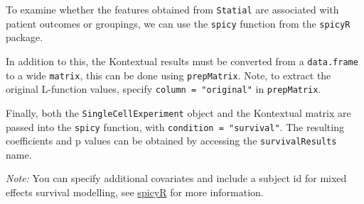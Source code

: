 \documentclass[
  letterpaper,
  DIV=11,
  numbers=noendperiod]{scrreprt}
\newenvironment{Shaded}{\begin{snugshade}}{\end{snugshade}}
\newcommand{\AttributeTok}[1]{\textcolor[rgb]{0.40,0.45,0.13}{#1}}
\newcommand{\CommentTok}[1]{\textcolor[rgb]{0.37,0.37,0.37}{#1}}
\newcommand{\ConstantTok}[1]{\textcolor[rgb]{0.56,0.35,0.01}{#1}}
\newcommand{\DecValTok}[1]{\textcolor[rgb]{0.68,0.00,0.00}{#1}}
\newcommand{\FunctionTok}[1]{\textcolor[rgb]{0.28,0.35,0.67}{#1}}
\newcommand{\NormalTok}[1]{\textcolor[rgb]{0.00,0.23,0.31}{#1}}
\newcommand{\OtherTok}[1]{\textcolor[rgb]{0.00,0.23,0.31}{#1}}
\newcommand{\SpecialCharTok}[1]{\textcolor[rgb]{0.37,0.37,0.37}{#1}}
\newcommand{\StringTok}[1]{\textcolor[rgb]{0.13,0.47,0.30}{#1}}
\begin{document}
To examine whether the features obtained from \texttt{Statial} are
associated with patient outcomes or groupings, we can use the
\texttt{spicy} function from the \texttt{spicyR} package.

In addition to this, the Kontextual results must be converted from a
\texttt{data.frame} to a wide \texttt{matrix}, this can be done using
\texttt{prepMatrix}. Note, to extract the original L-function values,
specify \texttt{column\ =\ "original"} in \texttt{prepMatrix}.

\begin{Shaded}
\end{Shaded}

Finally, both the \texttt{SingleCellExperiment} object and the
Kontextual matrix are passed into the \texttt{spicy} function, with
\texttt{condition\ =\ "survival"}. The resulting coefficients and p
values can be obtained by accessing the \texttt{survivalResults} name.

\emph{Note:} You can specify additional covariates and include a subject
id for mixed effects survival modelling, see
\href{https://bioconductor.org/packages/release/bioc/html/spicyR.html}{spicyR}
for more information.

\begin{Shaded}
\end{Shaded}
\end{document}
